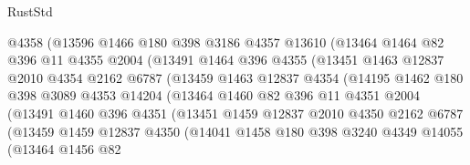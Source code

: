 \begin{lexlean}{RustStd}
\begin{coremodule}
{\begin{coremodule}
{{{{{{{{{{{{{{{{{{{{{{{{{{{{{{{                    @4358
                    (@13596
                      @1466
                      @180
                      @398
                      @3186
                      @4357
                      @13610
                      (@13464
                        @1464
                        @82
                        @396
                        @11
                        @4355
                        @2004
                        (@13491
                          @1464
                          @396
                          @4355
                          (@13451
                            @1463
                            @12837
                            @2010
                            @4354
                            @2162
                            @6787
                            (@13459
                              @1463
                              @12837
                              @4354
                              (@14195
                                @1462
                                @180
                                @398
                                @3089
                                @4353
                                @14204
                                (@13464
                                  @1460
                                  @82
                                  @396
                                  @11
                                  @4351
                                  @2004
                                  (@13491
                                    @1460
                                    @396
                                    @4351
                                    (@13451
                                      @1459
                                      @12837
                                      @2010
                                      @4350
                                      @2162
                                      @6787
                                      (@13459
                                        @1459
                                        @12837
                                        @4350
                                        (@14041
                                          @1458
                                          @180
                                          @398
                                          @3240
                                          @4349
                                          @14055
                                          (@13464
                                            @1456
                                            @82
}}}}}}}}}}}}}}}}}}}}}}}}}}}}}}}
\end{coremodule}}
\end{coremodule}
\end{lexlean}
